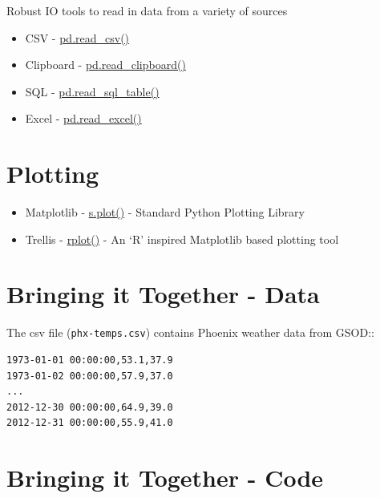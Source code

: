 \documentclass{article}
\begin{document}
Robust IO tools to read in data from a variety of sources

\begin{itemize}
\itemsep1pt\parskip0pt
\item
  CSV -
  \href{http://pandas.pydata.org/pandas-docs/stable/io.html\#io-read-csv-table}{pd.read\_csv()}
\item
  Clipboard -
  \href{http://pandas.pydata.org/pandas-docs/stable/io.html\#clipboard}{pd.read\_clipboard()}
\item
  SQL -
  \href{http://pandas.pydata.org/pandas-docs/stable/io.html\#sql-queries}{pd.read\_sql\_table()}
\item
  Excel -
  \href{http://pandas.pydata.org/pandas-docs/stable/io.html\#io-excel}{pd.read\_excel()}
\end{itemize}

    \section{Plotting}\label{plotting}

\begin{itemize}
\itemsep1pt\parskip0pt
\item
  Matplotlib -
  \href{http://pandas.pydata.org/pandas-docs/stable/visualization.html\#plotting-with-matplotlib}{s.plot()}
  - Standard Python Plotting Library
\item
  Trellis -
  \href{http://pandas.pydata.org/pandas-docs/stable/rplot.html}{rplot()}
  - An `R' inspired Matplotlib based plotting tool
\end{itemize}

    \section{Bringing it Together - Data}\label{bringing-it-together---data}

The csv file (\texttt{phx-temps.csv}) contains Phoenix weather data from
GSOD::

\begin{verbatim}
1973-01-01 00:00:00,53.1,37.9
1973-01-02 00:00:00,57.9,37.0
...
2012-12-30 00:00:00,64.9,39.0
2012-12-31 00:00:00,55.9,41.0
\end{verbatim}

    \section{Bringing it Together - Code}\label{bringing-it-together---code}
\end{document}
